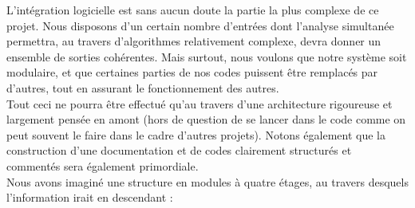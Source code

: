 		L'intégration logicielle est sans aucun doute la partie la plus complexe de ce projet. Nous disposons d'un certain nombre d'entrées dont l'analyse simultanée permettra, au travers d'algorithmes relativement complexe, devra donner un ensemble de sorties cohérentes. Mais surtout, nous voulons que notre système soit modulaire, et que certaines parties de nos codes puissent être remplacés par d'autres, tout en assurant le fonctionnement des autres.\\

		Tout ceci ne pourra être effectué qu'au travers d'une architecture rigoureuse et largement pensée en amont (hors de question de se lancer dans le code comme on peut souvent le faire dans le cadre d'autres projets). Notons également que la construction d'une documentation et de codes clairement structurés et commentés sera également primordiale.\\

		Nous avons imaginé une structure en modules à quatre étages, au travers desquels l'information irait en descendant :

